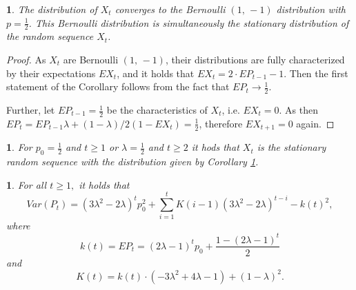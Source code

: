 \documentclass{amsart}
\theoremstyle{definition}
\theoremstyle{plain}
\newtheorem{prop}[thm]{\protect\propositionname}
\theoremstyle{plain}
\newtheorem{cor}[thm]{\protect\corollaryname}
\theoremstyle{plain}
\newtheorem{rem}[thm]{\protect\remarkname}
\numberwithin{equation}{section}
\providecommand{\corollaryname}{Corollary}
\providecommand{\propositionname}{Proposition}
\providecommand{\remarkname}{Remark}
\begin{document}
    \begin{cor}
        \label{cor-stac-dist}
        The distribution of $X_t$ converges to the Bernoulli $(1,\,-1)$ distribution with
        $p=\frac{1}{2}$. This Bernoulli distribution is simultaneously the stationary distribution of the random sequence $X_t$.
    \end{cor}

    \begin{proof}
        As $X_t$ are Bernoulli $(1,\,-1)$, their distributions are fully characterized by their expectations $EX_t$, and it holds that
        $EX_t=2\cdot EP_{t-1}-1$. Then the first statement of the Corollary follows from the fact that $EP_t\to \frac{1}{2}.$

        Further, let $EP_{t-1}=\frac{1}{2}$ be the characteristics of $X_t$, i.e.
        $EX_t=0$. As then
        $EP_t=EP_{t-1}\lambda+(1-\lambda)/2(1-EX_t)=\frac{1}{2}$, therefore $EX_{t+1}=0$ again.

    \end{proof}

    \begin{rem}
        For $p_0=\frac{1}{2}$ and $t\ge1$ or $\lambda = \frac{1}{2}$ and $t\ge2$ it hods that $X_t$ is the stationary
        random sequence with the distribution given by Corollary
        \ref{cor-stac-dist}.
    \end{rem}

    \begin{prop}
        \label{PropVarP-succes}For all $t\geq1,$ it holds that
        \begin{equation}
            Var(P_{t})=(3\lambda^{2}-2\lambda)^{t}p_{0}^{2}+\sum_{i=1}^{t}K(i-1)(3\lambda^{2}-2\lambda)^{t-i}-k(t)^{2},\label{eq:VarP-proposition}
        \end{equation}
        where
        \[
            k(t)=EP_{t}=(2\lambda-1)^{t}p_{0}+\frac{1-(2\lambda-1)^{t}}{2}
        \]
        and
        \[
            K(t)=k(t)\cdot(-3\lambda^{2}+4\lambda-1)+(1-\lambda)^{2}.
        \]
    \end{prop}
\end{document}

